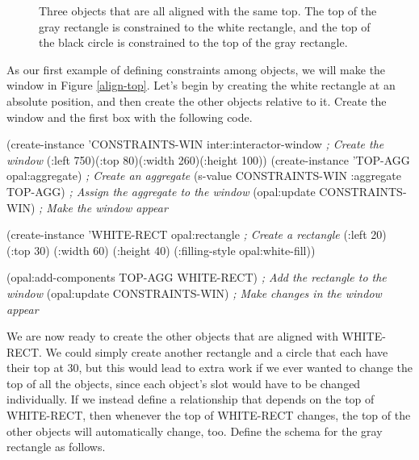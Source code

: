 \begin{figure}
\begin{center}
\end{center}
\caption{Three objects that are all aligned with the same top.  The
top of the gray rectangle is constrained to the white rectangle, and
the top of the black circle is constrained to the top of the gray rectangle.}
\end{figure}

As our first example of defining constraints among objects, we will
make the window in Figure \ref{align-top}.  Let's begin by creating
the white rectangle at an absolute position, and then create the other objects
relative to it.  Create the window and the first box with the
following code.

\begin{programexample}
(create-instance 'CONSTRAINTS-WIN inter:interactor-window      {\it ; Create the window}
   (:left 750)(:top 80)(:width 260)(:height 100))
(create-instance 'TOP-AGG opal:aggregate)                      {\it ; Create an aggregate}
(s-value CONSTRAINTS-WIN :aggregate TOP-AGG)                   {\it ; Assign the aggregate to the window}
(opal:update CONSTRAINTS-WIN)                                  {\it ; Make the window appear}

(create-instance 'WHITE-RECT opal:rectangle                    {\it ; Create a rectangle}
   (:left 20) (:top 30)
   (:width 60) (:height 40)
   (:filling-style opal:white-fill))
		
(opal:add-components TOP-AGG WHITE-RECT)                       {\it ; Add the rectangle to the window}
(opal:update CONSTRAINTS-WIN)                                  {\it ; Make changes in the window appear}
\end{programexample}

We are now ready to create the other objects that are aligned with
WHITE-RECT.  We could simply create another rectangle and a circle that
each have their top at 30, but this would lead to extra work if we ever
wanted to change the top of all the objects, since each object's
 slot would have to be changed individually.  If we instead
define a relationship that depends on the top of WHITE-RECT, then
whenever the top of WHITE-RECT changes, the top of the other objects
will automatically change, too.  Define the schema for the gray
rectangle as follows.

